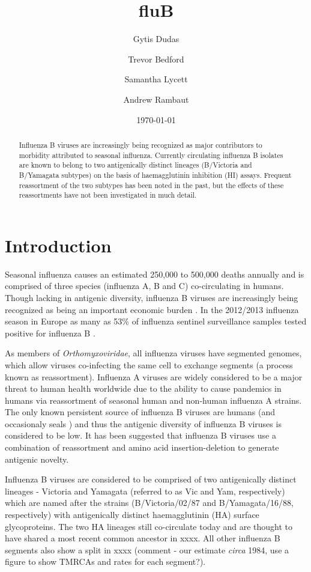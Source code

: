 \documentclass[11pt,oneside,letterpaper]{article}
\title{\vspace{1.0cm} \LARGE \bf fluB}
\author[1]{Gytis Dudas}
\author[1]{Trevor Bedford}
\author[1]{Samantha Lycett}
\author[1,2]{Andrew Rambaut}
\affil[1]{Institute of Evolutionary Biology, University of Edinburgh, Edinburgh, UK}
\affil[2]{Fogarty International Center, National Institutes of Health, Bethesda, MD, USA.}
\date{\today}
\begin{document}
\maketitle

\begin{abstract}

Influenza B viruses are increasingly being recognized as major contributors to morbidity attributed to seasonal influenza. Currently circulating influenza B isolates are known to belong to two antigenically distinct lineages (B/Victoria and B/Yamagata subtypes) on the basis of haemagglutinin inhibition (HI) assays. Frequent reassortment of the two subtypes has been noted in the past, but the effects of these reassortments have not been investigated in much detail.

\end{abstract}

\pagebreak


\section*{Introduction}
Seasonal influenza causes an estimated 250,000 to 500,000 deaths annually and is comprised of three species (influenza A, B and C) co-circulating in humans. Though lacking in antigenic diversity, influenza B viruses are increasingly being recognized as being an important economic burden \cite{paul-glezen2013}. In the 2012/2013 influenza season in Europe as many as 53\% of influenza sentinel surveillance samples tested positive for influenza B \cite{ECDC1213}. 

As members of \textit{Orthomyxoviridae}, all influenza viruses have segmented genomes, which allow viruses co-infecting the same cell to exchange segments (a process known as reassortment). Influenza A viruses are widely considered to be a major threat to human health worldwide due to the ability to cause pandemics in humans via reassortment of seasonal human and non-human influenza A strains. The only known persistent source of influenza B viruses are humans (and occasionaly seals \cite{osterhaus2000}) and thus the antigenic diversity of influenza B viruses is considered to be low. It has been suggested that influenza B viruses use a combination of reassortment and amino acid insertion-deletion to generate antigenic novelty.

Influenza B viruses are considered to be comprised of two antigenically distinct lineages - Victoria and Yamagata (referred to as Vic and Yam, respectively) which are named after the strains (B/Victoria/02/87 and B/Yamagata/16/88, respectively) with antigenically distinct haemagglutinin (HA) surface glycoproteins. The two HA lineages still co-circulate today and are thought to have shared a most recent common ancestor in xxxx. All other influenza B segments also show a split in xxxx (comment - our estimate \textit{circa} 1984, use a figure to show TMRCAs and rates for each segment?).
\end{document}
